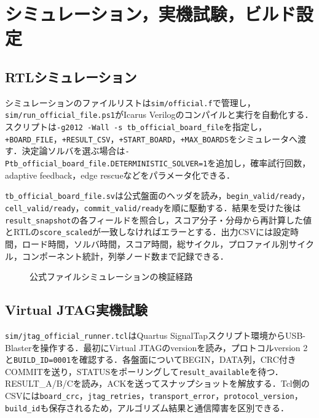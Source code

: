 \chapter{シミュレーション，実機試験，ビルド設定}
\label{chap:verification}

\section{RTLシミュレーション}
シミュレーションのファイルリストは\texttt{sim/official.f}で管理し，\texttt{sim/run\_official\_file.ps1}がIcarus Verilogのコンパイルと実行を自動化する．スクリプトは\texttt{-g2012 -Wall -s tb\_official\_board\_file}を指定し，\texttt{+BOARD\_FILE}，\texttt{+RESULT\_CSV}，\texttt{+START\_BOARD}，\texttt{+MAX\_BOARDS}をシミュレータへ渡す．決定論ソルバを選ぶ場合は\texttt{-Ptb\_official\_board\_file.DETERMINISTIC\_SOLVER=1}を追加し，確率試行回数，adaptive feedback，edge rescueなどをパラメータ化できる．

\texttt{tb\_official\_board\_file.sv}は公式盤面のヘッダを読み，\texttt{begin\_valid/ready}，\texttt{cell\_valid/ready}，\texttt{commit\_valid/ready}を順に駆動する．結果を受けた後は\texttt{result\_snapshot}の各フィールドを照合し，スコア分子・分母から再計算した値とRTLの\texttt{score\_scaled}が一致しなければエラーとする．出力CSVには設定時間，ロード時間，ソルバ時間，スコア時間，総サイクル，プロファイル別サイクル，コンポーネント統計，列挙ノード数まで記録できる．

\begin{figure}[tb]
\centering
{}
\caption{公式ファイルシミュレーションの検証経路}
\end{figure}

\section{Virtual JTAG実機試験}
\texttt{sim/jtag\_official\_runner.tcl}はQuartus SignalTapスクリプト環境からUSB-Blasterを操作する．最初にVirtual JTAGのversionを読み，プロトコルversion 2と\texttt{BUILD\_ID=0001}を確認する．各盤面についてBEGIN，DATA列，CRC付きCOMMITを送り，STATUSをポーリングして\texttt{result\_available}を待つ．RESULT\_A/B/Cを読み，ACKを送ってスナップショットを解放する．Tcl側のCSVには\texttt{board\_crc}，\texttt{jtag\_retries}，\texttt{transport\_error}，\texttt{protocol\_version}，\texttt{build\_id}も保存されるため，アルゴリズム結果と通信障害を区別できる．


